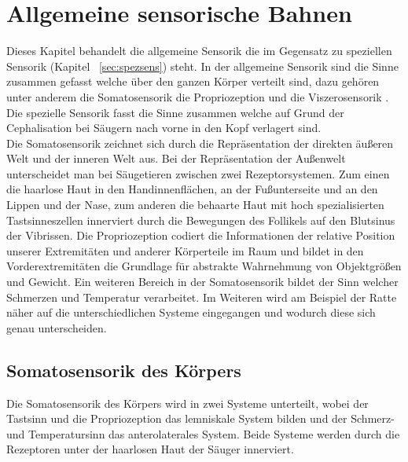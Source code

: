 \documentclass[12pt,a4paper,pdftex]{article}
\begin{document}
\newpage
\section{Allgemeine sensorische Bahnen}
Dieses Kapitel behandelt die allgemeine Sensorik  die im Gegensatz zu speziellen Sensorik (Kapitel~ \ref{sec:spezsens}) steht. In der allgemeine Sensorik sind die Sinne zusammen gefasst welche über den ganzen Körper verteilt sind, dazu gehören unter anderem die Somatosensorik  die Propriozeption  und die Viszerosensorik \cite[Kap. 22]{kandel2013principles}. Die spezielle Sensorik  fasst die Sinne zusammen welche auf Grund der Cephalisation bei Säugern nach vorne in den Kopf verlagert sind.
\\
Die Somatosensorik zeichnet sich durch die Repräsentation der direkten äußeren Welt und der inneren Welt aus. Bei der Repräsentation der Außenwelt unterscheidet man bei Säugetieren zwischen zwei Rezeptorsystemen. Zum einen die haarlose Haut in den Handinnenflächen, an der Fußunterseite und an den Lippen und der Nase, zum anderen die behaarte Haut mit hoch spezialisierten Tastsinneszellen innerviert durch die Bewegungen des Follikels auf den Blutsinus  der Vibrissen.   \cite{paxinos2014rat}
Die Propriozeption codiert die Informationen der relative Position unserer Extremitäten und anderer Körperteile im Raum und bildet in den Vorderextremitäten die Grundlage für abstrakte Wahrnehmung von Objektgrößen und Gewicht. Ein weiteren Bereich in der Somatosensorik bildet der Sinn welcher Schmerzen und Temperatur verarbeitet. \cite{paxinos2014rat}
Im Weiteren wird am Beispiel der Ratte näher auf die unterschiedlichen Systeme eingegangen und wodurch diese sich genau unterscheiden. 


\subsection{Somatosensorik  des Körpers}
Die Somatosensorik des Körpers wird in zwei Systeme unterteilt, wobei der Tastsinn  und die Propriozeption das lemniskale System  bilden und der Schmerz- und Temperatursinn  das anterolaterales System.  Beide Systeme werden durch die Rezeptoren unter der haarlosen Haut der Säuger innerviert.
\end{document}
